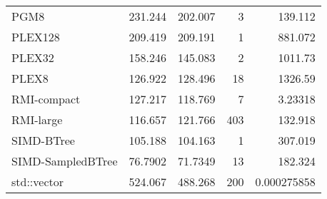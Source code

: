 \begin{tabular}{lrrrr}
 PGM8              &               231.244  &              202.007  &            3 &   139.112       \\
 PLEX128           &               209.419  &              209.191  &            1 &   881.072       \\
 PLEX32            &               158.246  &              145.083  &            2 &  1011.73        \\
 PLEX8             &               126.922  &              128.496  &           18 &  1326.59        \\
 RMI-compact       &               127.217  &              118.769  &            7 &     3.23318     \\
 RMI-large         &               116.657  &              121.766  &          403 &   132.918       \\
 SIMD-BTree        &               105.188  &              104.163  &            1 &   307.019       \\
 SIMD-SampledBTree &                76.7902 &               71.7349 &           13 &   182.324       \\
 std::vector       &               524.067  &              488.268  &          200 &     0.000275858 \\
\hline
\end{tabular}